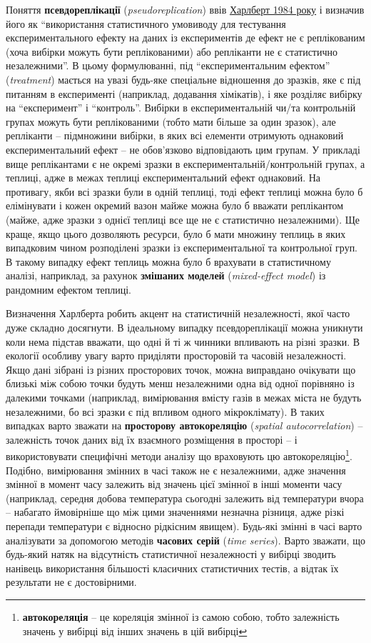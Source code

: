 \documentclass[
  11pt,
]{book}
\begin{document}
Поняття \textbf{псевдореплікації} (\emph{pseudoreplication}) ввів \href{https://doi.org/10.2307/1942661}{Харлберт 1984 року} і визначив його як ``використання статистичного умовиводу для тестування експериментального ефекту на даних із експериментів де ефект не є реплікованим (хоча вибірки можуть бути реплікованими) або репліканти не є статистично незалежними''. В цьому формулюванні, під ``експериментальним ефектом'' (\emph{treatment}) мається на увазі будь-яке спеціальне відношення до зразків, яке є під питанням в експерименті (наприклад, додавання хімікатів), і яке розділяє вибірку на ``експеримент'' і ``контроль''. Вибірки в експериментальній чи/та контрольній групах можуть бути реплікованими (тобто мати більше за один зразок), але репліканти -- підмножини вибірки, в яких всі елементи отримують однаковий експериментальний ефект -- не обов'язково відповідають цим групам. У прикладі вище реплікантами є не окремі зразки в експериментальній/контрольній групах, а теплиці, адже в межах теплиці експериментальний ефект однаковий. На противагу, якби всі зразки були в одній теплиці, тоді ефект теплиці можна було б елімінувати і кожен окремий вазон майже можна було б вважати реплікантом (майже, адже зразки з однієї теплиці все ще не є статистично незалежними). Ще краще, якщо цього дозволяють ресурси, було б мати множину теплиць в яких випадковим чином розподілені зразки із експериментальної та контрольної груп. В такому випадку ефект теплиць можна було б врахувати в статистичному аналізі, наприклад, за рахунок \textbf{змішаних моделей} (\emph{mixed-effect model}) із рандомним ефектом теплиці.

Визначення Харлберта робить акцент на статистичній незалежності, якої часто дуже складно досягнути. В ідеальному випадку псевдореплікації можна уникнути коли нема підстав вважати, що одні й ті ж чинники впливають на різні зразки. В екології особливу увагу варто приділяти просторовій та часовій незалежності. Якщо дані зібрані із різних просторових точок, можна виправдано очікувати що близькі між собою точки будуть менш незалежними одна від одної порівняно із далекими точками (наприклад, вимірювання вмісту газів в межах міста не будуть незалежними, бо всі зразки є під впливом одного мікроклімату). В таких випадках варто зважати на \textbf{просторову автокореляцію} (\emph{spatial autocorrelation}) -- залежність точок даних від їх взаємного розміщення в просторі -- і використовувати специфічні методи аналізу що враховують цю автокореляцію\footnote{\textbf{автокореляція} -- це кореляція змінної із самою собою, тобто залежність значень у вибірці від інших значень в цій вибірці}. Подібно, вимірювання змінних в часі також не є незалежними, адже значення змінної в момент часу залежить від значень цієї змінної в інші моменти часу (наприклад, середня добова температура сьогодні залежить від температури вчора -- набагато ймовірніше що між цими значеннями незначна різниця, адже різкі перепади температури є відносно рідкісним явищем). Будь-які змінні в часі варто аналізувати за допомогою методів \textbf{часових серій} (\emph{time series}). Варто зважати, що будь-який натяк на відсутність статистичної незалежності у вибірці зводить нанівець використання більшості класичних статистичних тестів, а відтак їх результати не є достовірними.
\end{document}
